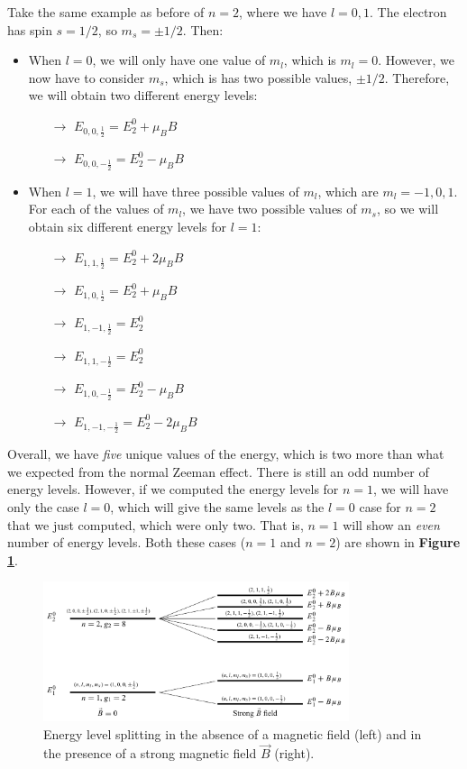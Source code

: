 Take the same example as before of $n=2$, where we have $l = 0, 1$. The electron has spin $s=1/2$, so $m_s=\pm 1/2$. Then:
\begin{itemize}
    \item When $l=0$, we will only have one value of $m_l$, which is $m_l = 0$. However, we now have to consider $m_s$, which is has two possible values, $\pm 1/2$. Therefore, we will obtain two different energy levels:
    \begin{itemize}
        \item[$\to$] $E_{0,0,\frac12} = E_2^0 +\mu_B B$
        \item[$\to$] $E_{0,0,-\frac12} = E_2^0 -\mu_B B$
    \end{itemize}
    \item When $l=1$, we will have three possible values of $m_l$, which are $m_l = -1, 0, 1$. For each of the values of $m_l$, we have two possible values of $m_s$, so we will obtain six different energy levels for $l=1$:
    \begin{itemize}
        \item[$\to$] $E_{1,1,\frac12} = E_2^0 + 2\mu_B B$
        \item[$\to$] $E_{1,0,\frac12} = E_2^0 + \mu_B B$
        \item[$\to$] $E_{1,-1,\frac12} = E_2^0$
        \item[$\to$] $E_{1,1,-\frac12} = E_2^0$
        \item[$\to$] $E_{1,0,-\frac12} = E_2^0 - \mu_B B$
        \item[$\to$] $E_{1,-1,-\frac12} = E_2^0 - 2\mu_B B$
    \end{itemize}
\end{itemize}

Overall, we have \textit{five} unique values of the energy, which is two more than what we expected from the normal Zeeman effect. There is still an odd number of energy levels. However, if we computed the energy levels for $n = 1$, we will have only the case $l=0$, which will give the same levels as the $l=0$ case for $n=2$ that we just computed, which were only two. That is, $n=1$ will show an \textit{even} number of energy levels. Both these cases ($n=1$ and $n=2$) are shown in \textbf{Figure \ref{fig:strong_B_zeeman}}.

\begin{figure}[htbp]
    \centering
    \includegraphics[width=0.8\textwidth]{images/strong_B_zeeman.png}
    \caption{Energy level splitting in the absence of a magnetic field (left) and in the presence of a strong magnetic field $\vec{B}$ (right).}
    \label{fig:strong_B_zeeman}
\end{figure}

